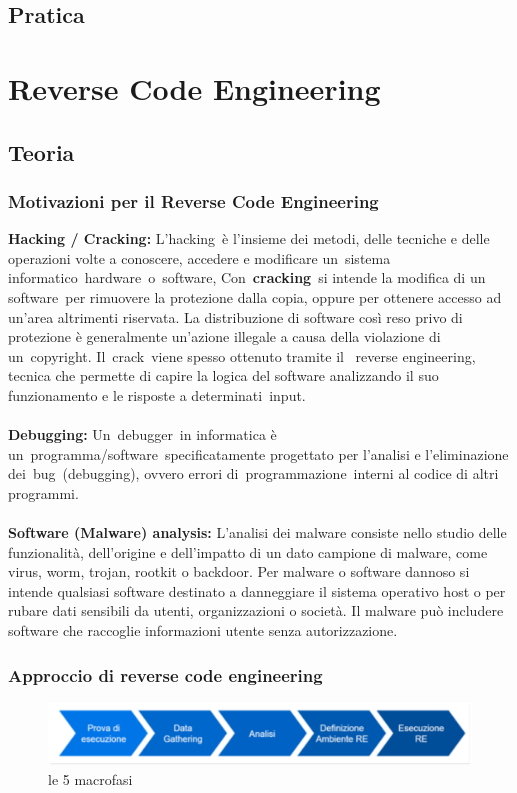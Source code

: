 \documentclass{article}
\begin{document}
\subsection{Pratica}

\section{Reverse Code Engineering}
\subsection{Teoria}
\subsubsection{Motivazioni per il Reverse Code Engineering}
\noindent
\textbf{Hacking / Cracking:}
L'hacking è l'insieme dei metodi, delle tecniche e delle operazioni volte a conoscere, accedere e 
modificare un sistema informatico hardware o software, Con \textbf{cracking} si intende la modifica di un 
software per rimuovere la protezione dalla copia, oppure per ottenere accesso ad un'area altrimenti 
riservata. La distribuzione di software così reso privo di protezione è generalmente un'azione 
illegale a causa della violazione di un copyright. Il crack viene spesso ottenuto tramite il 
reverse engineering, tecnica che permette di capire la logica del software analizzando il suo 
funzionamento e le risposte a determinati input.\\\\
\textbf{Debugging:}
Un debugger in informatica è un programma/software specificatamente progettato per l'analisi e 
l'eliminazione dei bug (debugging), ovvero errori di programmazione interni al codice di altri programmi.\\\\
\textbf{Software (Malware) analysis:}
L'analisi dei malware consiste nello studio delle funzionalità, dell'origine e dell'impatto di un dato 
campione di malware, come virus, worm, trojan, rootkit o backdoor. Per malware o software dannoso si 
intende qualsiasi software destinato a danneggiare il sistema operativo host o per rubare dati 
sensibili da utenti, organizzazioni o società. Il malware può includere software che raccoglie 
informazioni utente senza autorizzazione.
\subsubsection{Approccio di reverse code engineering}
\begin{figure}[H]
    \center
    \includegraphics[scale=0.3]{images/Macrofasi.png}
    \caption{le 5 macrofasi}\label{fig:1}
\end{figure}
\end{document}
